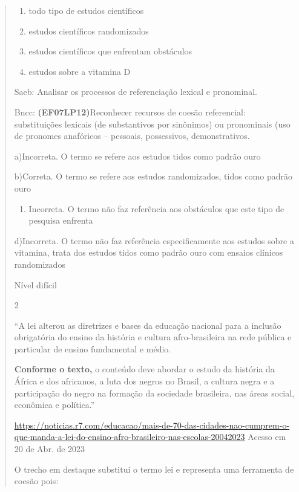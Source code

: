 {\begin{quote}
{\begin{enumerate}
\item
  todo tipo de estudos científicos
\item
  estudos científicos randomizados
\item
  estudos científicos que enfrentam obstáculos
\item
  estudos sobre a vitamina D
\end{enumerate}

Saeb: Analisar os processos de referenciação lexical e pronominal.

Bncc: \textbf{(EF07LP12)}Reconhecer recursos de coesão referencial:
substituições lexicais (de substantivos por sinônimos) ou pronominais
(uso de pronomes anafóricos -- pessoais, possessivos, demonstrativos.

a)Incorreta. O termo se refere aos estudos tidos como padrão ouro

b)Correta. O termo se refere aos estudos randomizados, tidos como padrão
ouro

\begin{enumerate}
\def\labelenumi{\arabic{enumi}.}
\tightlist
\item
  Incorreta. O termo não faz referência aos obstáculos que este tipo de
  pesquisa enfrenta
\end{enumerate}

d)Incorreta. O termo não faz referência especificamente aos estudos
sobre a vitamina, trata dos estudos tidos como padrão ouro com ensaios
clínicos randomizados

Nível difícil

\num{2}

``A lei alterou as diretrizes e bases da educação nacional para a
inclusão obrigatória do ensino da história e cultura afro-brasileira na
rede pública e particular de ensino fundamental e médio.

\textbf{Conforme o texto,} o conteúdo deve abordar o estudo da história
da África e dos africanos, a luta dos negros no Brasil, a cultura negra
e a participação do negro na formação da sociedade brasileira, nas áreas
social, econômica e política.''

\href{https://noticias.r7.com/educacao/mais-de-70-das-cidades-nao-cumprem-o-que-manda-a-lei-do-ensino-afro-brasileiro-nas-escolas-20042023}{\uline{https://noticias.r7.com/educacao/mais-de-70-das-cidades-nao-cumprem-o-que-manda-a-lei-do-ensino-afro-brasileiro-nas-escolas-20042023}}
Acesso em 20 de Abr. de 2023

O trecho em destaque substitui o termo lei e representa uma ferramenta
de coesão pois:

}
\end{quote}}
